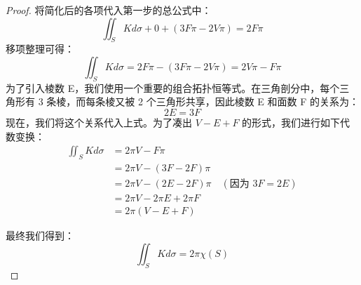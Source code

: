 \documentclass[lang=cn,10pt,thmcnt=section]{elegantbook}
\begin{document}
\begin{proof}
将简化后的各项代入第一步的总公式中：
$$\iint_S K d\sigma + 0 + (3F\pi - 2V\pi) = 2F\pi$$
移项整理可得：
$$\iint_S K d\sigma = 2F\pi - (3F\pi - 2V\pi) = 2V\pi - F\pi$$
为了引入棱数 E，我们使用一个重要的组合拓扑恒等式。在三角剖分中，每个三角形有 3 条棱，而每条棱又被 2 个三角形共享，因此棱数 E 和面数 F 的关系为：
$$2E = 3F$$
现在，我们将这个关系代入上式。为了凑出 $V-E+F$ 的形式，我们进行如下代数变换：
\begin{align*}
\iint_S K d\sigma &= 2\pi V - F\pi \\
&= 2\pi V - (3F - 2F)\pi \\
&= 2\pi V - (2E - 2F)\pi \quad (\text{因为 } 3F=2E) \\
&= 2\pi V - 2\pi E + 2\pi F \\
&= 2\pi (V - E + F)
\end{align*}



最终我们得到：
$$\iint_S K d\sigma = 2\pi \chi(S)$$
\end{proof}
\end{document}
